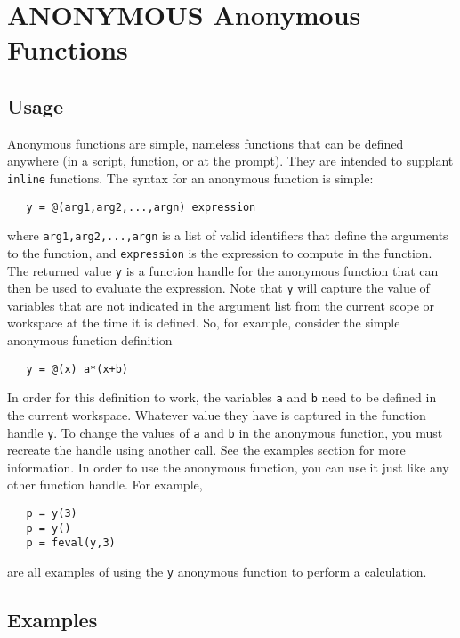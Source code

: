 \section{ANONYMOUS Anonymous Functions}

\subsection{Usage}

Anonymous functions are simple, nameless functions that can be defined
anywhere (in a script, function, or at the prompt).  They are intended
to supplant \verb|inline| functions.  The syntax for an anonymous function
is simple:
\begin{verbatim}
   y = @(arg1,arg2,...,argn) expression
\end{verbatim}
where \verb|arg1,arg2,...,argn| is a list of valid identifiers that define
the arguments to the function, and \verb|expression| is the expression to
compute in the function.  The returned value \verb|y| is a function handle
for the anonymous function that can then be used to evaluate the expression.
Note that \verb|y| will capture the value of variables that are not indicated
in the argument list from the current scope or workspace at the time
it is defined.  So, for example, consider the simple anonymous function
definition
\begin{verbatim}
   y = @(x) a*(x+b)
\end{verbatim}
In order for this definition to work, the variables \verb|a| and \verb|b| need to
be defined in the current workspace.  Whatever value they have is captured
in the function handle \verb|y|.  To change the values of \verb|a| and \verb|b| in the
anonymous function, you must recreate the handle using another call.  See
the examples section for more information.  In order to use the anonymous
function, you can use it just like any other function handle.  For example,
\begin{verbatim}
   p = y(3)
   p = y()
   p = feval(y,3)
\end{verbatim}
are all examples of using the \verb|y| anonymous function to perform a calculation.
\subsection{Examples}

